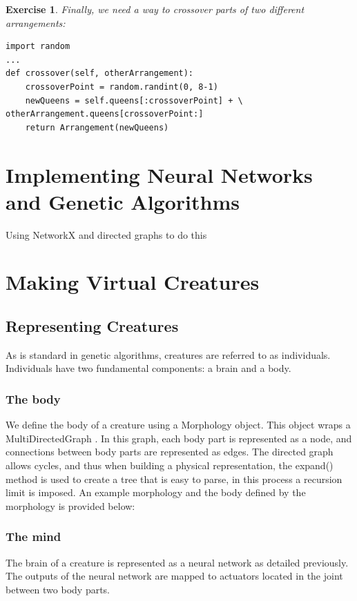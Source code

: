 \documentclass[12pt]{article}
\newtheorem{ex}{Exercise}
\begin{document}
\begin{ex}
Finally, we need a way to \emph{crossover} parts of two different arrangements:
\begin{verbatim}
import random
...
def crossover(self, otherArrangement):
	crossoverPoint = random.randint(0, 8-1)
	newQueens = self.queens[:crossoverPoint] + \
otherArrangement.queens[crossoverPoint:]
	return Arrangement(newQueens)
\end{verbatim}


\end{ex}

\section{Implementing Neural Networks and Genetic Algorithms}

Using NetworkX and directed graphs to do this


\section{Making Virtual Creatures}

\subsection{Representing Creatures}
As is standard in genetic algorithms, creatures are referred to as individuals. Individuals have two fundamental components: a brain and a body. 

\subsubsection{The body}
We define the body of a creature using a Morphology object. This object wraps a MultiDirectedGraph .  In this graph, each body part is represented as a node, and connections between body parts are represented as edges. The directed graph allows cycles, and thus when building a physical representation, the expand() method is used to create a tree that is easy to parse, in this process a recursion limit is imposed. An example morphology and the body defined by the morphology is provided below:

\subsubsection{The mind}
The brain of a creature is represented as a neural network as detailed previously.  The outputs of the neural network are mapped to actuators located in the joint between two body parts. 
\end{document}

